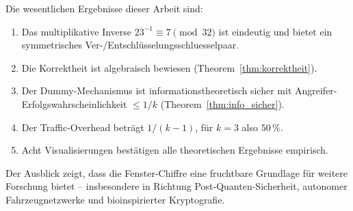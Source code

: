 ﻿\documentclass[12pt, a4paper]{article}
\theoremstyle{plain}
\theoremstyle{definition}
\theoremstyle{remark}
\begin{document}
Die wesentlichen Ergebnisse dieser Arbeit sind:
\begin{enumerate}[label=(\roman*)]
  \item Das multiplikative Inverse $23^{-1} \equiv 7 \pmod{32}$ ist eindeutig
        und bietet ein symmetrisches Ver-/Entschl\"usselungsschluesselpaar.
  \item Die Korrektheit ist algebraisch bewiesen (Theorem~\ref{thm:korrektheit}).
  \item Der Dummy-Mechanismus ist informationstheoretisch sicher mit
        Angreifer-Erfolgs\-wahrscheinlichkeit $\leq 1/k$ (Theorem~\ref{thm:info_sicher}).
  \item Der Traffic-Overhead betr\"agt $1/(k-1)$, f\"ur $k=3$ also $50\,\%$.
  \item Acht Visualisierungen best\"atigen alle theoretischen Ergebnisse empirisch.
\end{enumerate}

Der Ausblick zeigt, dass die Fenster-Chiffre eine fruchtbare Grundlage
f\"ur weitere Forschung bietet -- insbesondere in Richtung Post-Quanten-Sicherheit,
autonomer Fahrzeugnetzwerke und bioinspirierter Kryptografie.
\end{document}
